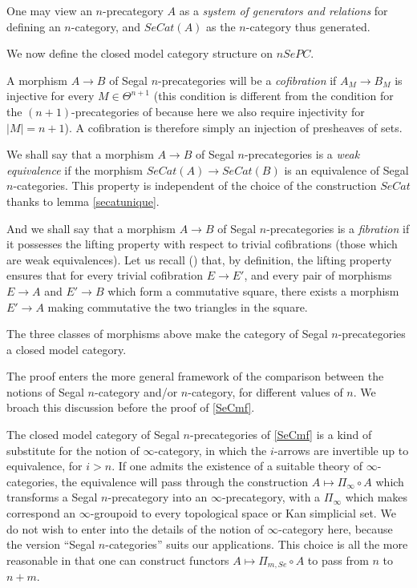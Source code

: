 One may view an $n$-precategory $A$ as a {\em system of generators
and relations} for defining an $n$-category, and $SeCat(A)$ as the
$n$-category thus generated.

We now define the closed model category structure on
$nSePC$.

A morphism $A\rightarrow B$ of Segal $n$-precategories will be a {\em
cofibration} if $A_M\rightarrow B_M$ is injective for every $M\in \Theta ^{n+1}$
(this condition is different from the condition for the
$(n+1)$-precategories of \cite{nCAT} because here we also require
injectivity for $|M|=n+1$). A cofibration is
therefore simply an injection of presheaves
of sets.

We shall say that a morphism $A\rightarrow B$ of Segal $n$-precategories is
a {\em
weak equivalence} if the morphism
$SeCat(A)\rightarrow SeCat(B)$ is an equivalence
of Segal $n$-categories. This property is independent of the choice of
the construction $SeCat$ thanks to lemma \ref{secatunique}.

And we shall say that a morphism $A\rightarrow B$ of Segal $n$-precategories
is a {\em
fibration} if it possesses the lifting property with respect to
trivial cofibrations (those which are weak equivalences). Let us
recall (\cite{Quillen}) that, by definition,
the lifting property ensures that
for every trivial cofibration $E\rightarrow E'$, and every pair of morphisms
$E\rightarrow A$ and $E'\rightarrow B$ which form a commutative square, there
exists a morphism $E'\rightarrow A$ making commutative the two triangles
in the square.

\begin{theorem}
\label{SeCmf}
The three classes of morphisms
above
make the category of Segal $n$-precategories
a closed model category.
\end{theorem}

The proof enters the more general framework of the comparison
between the notions of Segal $n$-category and/or $n$-category, for
different values of $n$. We broach this discussion before
the proof of \ref{SeCmf}.


The closed model category of Segal $n$-precategories of
\ref{SeCmf} is a kind of substitute for the notion of $\infty$-category,
in which the $i$-arrows are invertible up to equivalence, for
$i>n$. If one admits the existence of a suitable theory of $\infty$-categories,
the equivalence
will pass through the construction $A\mapsto \Pi _{\infty} \circ A$ which
transforms a
Segal $n$-precategory into an $\infty$-precategory, with a $\Pi _{\infty}$
which makes correspond an
$\infty$-groupoid to every topological space or Kan simplicial set.
We do not wish to enter into the details of the notion of
$\infty$-category
here, because the version ``Segal $n$-categories'' suits our
applications.
This choice is all the more reasonable in that one can construct
functors $A\mapsto \Pi
_{m,Se}\circ A$ to pass from $n$ to $n+m$.




